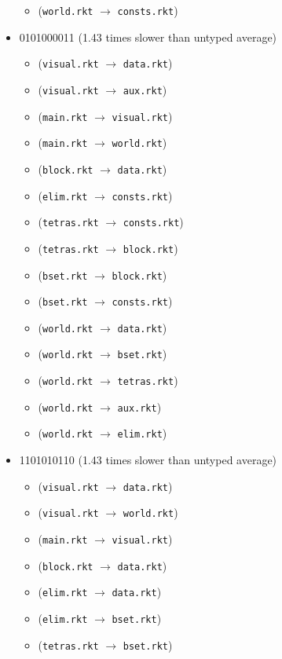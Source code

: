 \documentclass{article}
\newcommand{\mono}[1]{\texttt{#1}}
\begin{document}
\begin{itemize}
\begin{itemize}
  \item (\mono{world.rkt} $\rightarrow$ \mono{consts.rkt})
  \end{itemize}
\item 0101000011 (1.43 times slower than untyped average)
  \begin{itemize}
  \item (\mono{visual.rkt} $\rightarrow$ \mono{data.rkt})
  \item (\mono{visual.rkt} $\rightarrow$ \mono{aux.rkt})
  \item (\mono{main.rkt} $\rightarrow$ \mono{visual.rkt})
  \item (\mono{main.rkt} $\rightarrow$ \mono{world.rkt})
  \item (\mono{block.rkt} $\rightarrow$ \mono{data.rkt})
  \item (\mono{elim.rkt} $\rightarrow$ \mono{consts.rkt})
  \item (\mono{tetras.rkt} $\rightarrow$ \mono{consts.rkt})
  \item (\mono{tetras.rkt} $\rightarrow$ \mono{block.rkt})
  \item (\mono{bset.rkt} $\rightarrow$ \mono{block.rkt})
  \item (\mono{bset.rkt} $\rightarrow$ \mono{consts.rkt})
  \item (\mono{world.rkt} $\rightarrow$ \mono{data.rkt})
  \item (\mono{world.rkt} $\rightarrow$ \mono{bset.rkt})
  \item (\mono{world.rkt} $\rightarrow$ \mono{tetras.rkt})
  \item (\mono{world.rkt} $\rightarrow$ \mono{aux.rkt})
  \item (\mono{world.rkt} $\rightarrow$ \mono{elim.rkt})
  \end{itemize}
\item 1101010110 (1.43 times slower than untyped average)
  \begin{itemize}
  \item (\mono{visual.rkt} $\rightarrow$ \mono{data.rkt})
  \item (\mono{visual.rkt} $\rightarrow$ \mono{world.rkt})
  \item (\mono{main.rkt} $\rightarrow$ \mono{visual.rkt})
  \item (\mono{block.rkt} $\rightarrow$ \mono{data.rkt})
  \item (\mono{elim.rkt} $\rightarrow$ \mono{data.rkt})
  \item (\mono{elim.rkt} $\rightarrow$ \mono{bset.rkt})
  \item (\mono{tetras.rkt} $\rightarrow$ \mono{bset.rkt})

\end{itemize}
\end{itemize}
\end{document}

